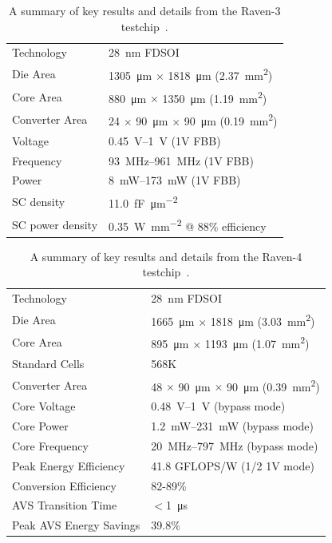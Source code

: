 \documentclass[graybox]{svmult}
\begin{document}
\begin{table}[]
\footnotesize
\renewcommand{\arraystretch}{1.2}
\centering
\begin{tabular}{@{}ll@{}}
\toprule
Technology & \SI{28}{\nano\meter} FDSOI\\ 
Die Area & \SI{1305}{\micro\meter} $\times$ \SI{1818}{\micro\meter} (\SI{2.37}{\milli\meter\squared})\\ 
Core Area & \SI{880}{\micro\meter} $\times$ \SI{1350}{\micro\meter} (\SI{1.19}{\milli\meter\squared})\\ 
Converter Area & 24 $\times$ \SI{90}{\micro\meter} $\times$ \SI{90}{\micro\meter} (\SI{0.19}{\milli\meter\squared})\\ 
Voltage & \SIrange{0.45}{1}{\volt} (1V FBB)\\ 
Frequency & \SIrange{93}{961}{\mega\hertz} (1V FBB) \\ 
Power & \SIrange{8}{173}{\milli\watt} (1V FBB)\\ 
SC density & \SI[per-mode=symbol]{11.0}{\femto\farad\per\micro\meter\squared}\\ 
SC power density &\SI[per-mode=symbol]{0.35}{\watt\per\milli\meter\squared} @ 88\% efficiency \\
\bottomrule
\end{tabular}
\caption{A summary of key results and details from the Raven-3 testchip~\cite{Zimmer2016}.}
\label{tab:raven3-summary}
\end{table}

\begin{table}[]
\footnotesize
\renewcommand{\arraystretch}{1.2}
\centering
\begin{tabular}{@{}ll@{}}
\toprule
Technology & \SI{28}{\nano\meter} FDSOI\\
Die Area & \SI{1665}{\micro\meter} $\times$ \SI{1818}{\micro\meter} (\SI{3.03}{\milli\meter\squared})\\
Core Area & \SI{895}{\micro\meter} $\times$ \SI{1193}{\micro\meter} (\SI{1.07}{\milli\meter\squared})\\
Standard Cells & 568K \\
Converter Area & 48 $\times$ \SI{90}{\micro\meter} $\times$ \SI{90}{\micro\meter} (\SI{0.39}{\milli\meter\squared})\\
Core Voltage & \SIrange{0.48}{1}{\volt} (bypass mode)\\
Core Power & \SIrange{1.2}{231}{\milli\watt} (bypass mode)\\
Core Frequency & \SIrange{20}{797}{\mega\hertz} (bypass mode)\\
Peak Energy Efficiency & 41.8 GFLOPS/W (1/2 1V mode)\\
Conversion Efficiency & 82-89\%\\
AVS Transition Time & $<$\SI{1}{\micro\second}\\
Peak AVS Energy Savings & 39.8\%\\
\bottomrule
\end{tabular}
\caption{A summary of key results and details from the Raven-4 testchip~\cite{Keller2017}.}
\label{tab:raven4-summary}
\end{table}
\end{document}

